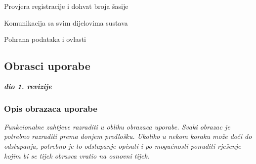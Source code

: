 \begin{packed_enum}
\begin{packed_enum}
					\item Provjera registracije i dohvat broja šasije
					
				\end{packed_enum}
			
				\item {}
				
				\begin{packed_enum}
					
					\item Komunikacija sa svim dijelovima sustava
					\item Pohrana podataka i ovlasti
					
				\end{packed_enum}
				
			\end{packed_enum}
			
			\eject 
			
			
				
			\subsection{Obrasci uporabe}
				
				\textbf{\textit{dio 1. revizije}}
				
				\subsubsection{Opis obrazaca uporabe}
					\textit{Funkcionalne zahtjeve razraditi u obliku obrazaca uporabe. Svaki obrazac je potrebno razraditi prema donjem predlošku. Ukoliko u nekom koraku može doći do odstupanja, potrebno je to odstupanje opisati i po mogućnosti ponuditi rješenje kojim bi se tijek obrasca vratio na osnovni tijek.}\\
					

